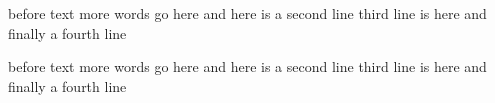 before text more words go here %
    and here is a second line
 third line is here%
and finally a fourth line

before text more words go here
    and here is a second line
 third line is here
and finally a fourth line
